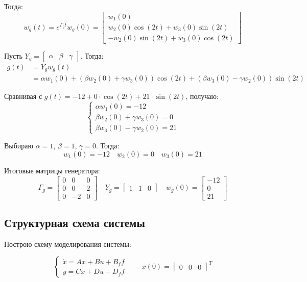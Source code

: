 \documentclass[a4paper,12pt]{article}
\begin{document}
	Тогда:
	\[
	w_g(t) = e^{\Gamma_g t} w_g(0) =
	\begin{bmatrix}
		w_1(0) \\
		w_2(0)\cos(2t) + w_3(0)\sin(2t) \\
		-w_2(0)\sin(2t) + w_3(0)\cos(2t)
	\end{bmatrix}
	\]
	
	Пусть \(Y_g = \begin{bmatrix} \alpha & \beta & \gamma \end{bmatrix}\). Тогда:
	\begin{align*}
		g(t) &= Y_g w_g(t) \\
		&= \alpha w_1(0) + (\beta w_2(0) + \gamma w_3(0))\cos(2t) + (\beta w_3(0) - \gamma w_2(0))\sin(2t)
	\end{align*}
	
	Сравнивая с \(g(t) = -12 + 0 \cdot \cos(2t) + 21 \cdot \sin(2t)\), получаю:
	\[
	\begin{cases}
		\alpha w_1(0) = -12 \\
		\beta w_2(0) + \gamma w_3(0) = 0 \\
		\beta w_3(0) - \gamma w_2(0) = 21
	\end{cases}
	\]
	
	Выбираю \(\alpha = 1\), \(\beta = 1\), \(\gamma = 0\). Тогда:
	\[
	w_1(0) = -12 \quad w_2(0) = 0 \quad w_3(0) = 21
	\]
	
	Итоговые матрицы генератора:
	\[
	\Gamma_g =
	\begin{bmatrix}
		0 & 0 & 0 \\
		0 & 0 & 2 \\
		0 & -2 & 0
	\end{bmatrix} \quad
	Y_g = \begin{bmatrix} 1 & 1 & 0 \end{bmatrix} \quad
	w_g(0) = \begin{bmatrix} -12 \\ 0 \\ 21 \end{bmatrix}
	\]
	
	
	\subsection{Структурная схема системы}
	
	Построю схему моделирования системы:
	
	\[
	\begin{cases}
		\dot{x} = Ax + Bu + B_f f \\
		y = Cx + Du + D_f f
	\end{cases}
	\qquad
	x(0) = \begin{bmatrix} 0 & 0 & 0 \end{bmatrix}^T
	\]
	
\end{document}
